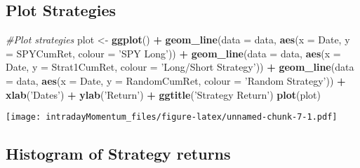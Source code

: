 \documentclass[]{article}
\newenvironment{Shaded}{\begin{snugshade}}{\end{snugshade}}
\newcommand{\CommentTok}[1]{\textcolor[rgb]{0.56,0.35,0.01}{\textit{#1}}}
\newcommand{\DataTypeTok}[1]{\textcolor[rgb]{0.13,0.29,0.53}{#1}}
\newcommand{\KeywordTok}[1]{\textcolor[rgb]{0.13,0.29,0.53}{\textbf{#1}}}
\newcommand{\NormalTok}[1]{#1}
\newcommand{\OperatorTok}[1]{\textcolor[rgb]{0.81,0.36,0.00}{\textbf{#1}}}
\newcommand{\StringTok}[1]{\textcolor[rgb]{0.31,0.60,0.02}{#1}}
\begin{document}
\hypertarget{plot-strategies}{%
\subsection{Plot Strategies}\label{plot-strategies}}

\begin{Shaded}
\begin{Highlighting}[]
\CommentTok{#Plot strategies}
\NormalTok{plot <-}\StringTok{ }\KeywordTok{ggplot}\NormalTok{() }\OperatorTok{+}
\StringTok{  }\KeywordTok{geom_line}\NormalTok{(}\DataTypeTok{data =}\NormalTok{ data, }\KeywordTok{aes}\NormalTok{(}\DataTypeTok{x =}\NormalTok{ Date, }\DataTypeTok{y =}\NormalTok{ SPYCumRet, }\DataTypeTok{colour =} \StringTok{'SPY Long'}\NormalTok{)) }\OperatorTok{+}\StringTok{ }
\StringTok{  }\KeywordTok{geom_line}\NormalTok{(}\DataTypeTok{data =}\NormalTok{ data, }\KeywordTok{aes}\NormalTok{(}\DataTypeTok{x =}\NormalTok{ Date, }\DataTypeTok{y =}\NormalTok{ Strat1CumRet, }\DataTypeTok{colour =} \StringTok{'Long/Short Strategy'}\NormalTok{)) }\OperatorTok{+}\StringTok{ }
\StringTok{  }\KeywordTok{geom_line}\NormalTok{(}\DataTypeTok{data =}\NormalTok{ data, }\KeywordTok{aes}\NormalTok{(}\DataTypeTok{x =}\NormalTok{ Date, }\DataTypeTok{y =}\NormalTok{ RandomCumRet, }\DataTypeTok{colour =} \StringTok{'Random Strategy'}\NormalTok{)) }\OperatorTok{+}\StringTok{ }
\StringTok{  }\KeywordTok{xlab}\NormalTok{(}\StringTok{'Dates'}\NormalTok{) }\OperatorTok{+}\StringTok{ }\KeywordTok{ylab}\NormalTok{(}\StringTok{'Return'}\NormalTok{) }\OperatorTok{+}\StringTok{ }\KeywordTok{ggtitle}\NormalTok{(}\StringTok{'Strategy Return'}\NormalTok{)}
\KeywordTok{plot}\NormalTok{(plot)}
\end{Highlighting}
\end{Shaded}

\texttt{[image: intradayMomentum\_files/figure-latex/unnamed-chunk-7-1.pdf]}

\hypertarget{histogram-of-strategy-returns}{%
\subsection{Histogram of Strategy
returns}\label{histogram-of-strategy-returns}}

\begin{Shaded}
\end{Shaded}
\end{document}
